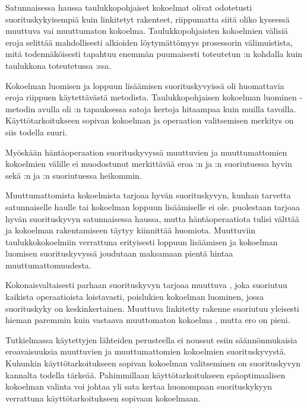 Satunnaisessa haussa taulukkopohjaiset kokoelmat olivat odotetusti suorituskykyisempiä kuin linkitetyt rakenteet, riippumatta siitä oliko kyseessä muuttuva vai muuttumaton kokoelma. Taulukkopohjaisten kokoelmien välisiä eroja selittää mahdollisesti alkioiden löytymättömyys prosessorin välimuistista, mitä todennäköisesti tapahtuu enemmän puumaisesti toteutetun :n kohdalla kuin taulukkona toteutetussa :ssa.

Kokoelman luomisen ja loppuun lisäämisen suorituskyvyissä oli huomattavia eroja riippuen käytettävästä metodista. Taulukkopohjaisen kokoelman luominen \code{:+}-metodin avulla oli :n tapauksessa satoja kertoja hitaampaa kuin muilla tavoilla. Käyttötarkoitukseen sopivan kokoelman ja operaation valitsemisen merkitys on siis todella suuri.

Myöskään häntäoperaation suorituskyvyssä muuttuvien ja muuttumattomien kokoelmien välille ei muodostunut merkittävää eroa :n ja :n suoriutuessa hyvin sekä :n ja :n suoriutuessa heikommin. 

Muuttumattomista kokoelmista  tarjoaa hyvän suorituskyvyn, kunhan tarvetta satunnaiselle haulle tai kokoelman loppuun lisäämiselle ei ole.  puolestaan tarjoaa hyvän suorituskyvyn satunnaisessa haussa, mutta häntäoperaatiota tulisi välttää ja kokoelman rakentamiseen täytyy kiinnittää huomiota. Muuttuviin taulukkokokoelmiin verrattuna erityisesti loppuun lisäämisen ja kokoelman luomisen suorituskyvyssä joudutaan maksamaan pientä hintaa muuttumattomuudesta.

Kokonaisvaltaisesti parhaan suorituskyvyn tarjoaa muuttuva , joka suoriutuu kaikista operaatioista loistavasti, poislukien kokoelman luominen, jossa suorituskyky on keskinkertainen. Muuttuva linkitetty rakenne  suoriutuu yleisesti hieman paremmin kuin vastaava muuttomaton kokoelma , mutta ero on pieni.

Tutkielmassa käytettyjen lähteiden perusteella ei noussut esiin säännönmukaisia eroavaisuuksia muuttuvien ja muuttumattomien kokoelmien suorituskyvystä. Kuhunkin käyttötarkoitukseen sopivan kokoelman valitseminen on suorituskyvyn kannalta todella tärkeää. Pahimmillaan käyttötarkoitukseen epäoptimaalisen kokoelman valinta voi johtaa yli sata kertaa huonompaan suorituskykyyn verrattuna käyttötarkoitukseen sopivaan kokoelmaan.
